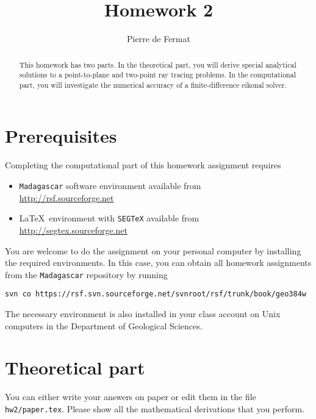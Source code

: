 \author{Pierre de Fermat} 
\title{Homework 2}

\begin{abstract}
  This homework has two parts. In the theoretical part, you will
  derive special analytical solutions to a point-to-plane and
  two-point ray tracing problems. In the computational part, you will
  investigate the numerical accuracy of a finite-difference eikonal solver.
\end{abstract}

\section{Prerequisites}

Completing the computational part of this homework assignment requires
\begin{itemize}
\item \texttt{Madagascar} software environment available from \\
\url{http://rsf.sourceforge.net}
\item \LaTeX\ environment with \texttt{SEGTeX} available from \\ 
\url{http://segtex.sourceforge.net}
\end{itemize}

You are welcome to do the assignment on your personal computer by
installing the required environments. In this case, you can obtain all
homework assignments from the \texttt{Madagascar} repository by running
\begin{verbatim}
svn co https://rsf.svn.sourceforge.net/svnroot/rsf/trunk/book/geo384w 
\end{verbatim}

The necessary environment is also installed in your class account on
Unix computers in the Department of Geological Sciences.

\section{Theoretical part}

You can either write your answers on paper or edit them in the file
\verb#hw2/paper.tex#. Please show all the mathematical
derivations that you perform.

